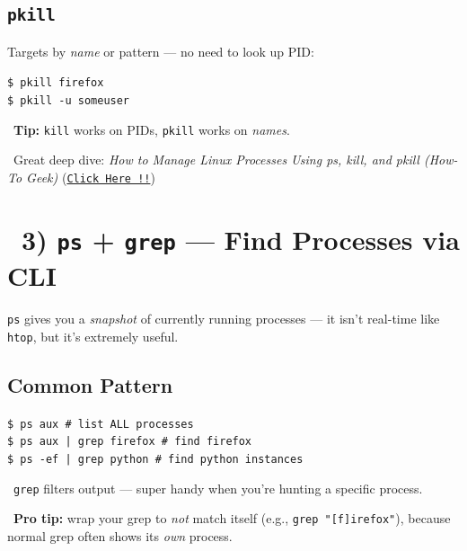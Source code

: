 \documentclass[12pt]{article}
\newcommand{\searchicon}{\faSearch}
\newcommand{\arrowicon}{\faArrowRight}
\begin{document}
\subsection*{\texttt{pkill}}

Targets by \textit{name} or pattern — no need to look up PID:

\begin{highlightbox}
\texttt{\$ pkill firefox}\\
\texttt{\$ pkill -u someuser}
\end{highlightbox}

\begin{infobox}
\faBrain\ \textbf{Tip:} \texttt{kill} works on PIDs, \texttt{pkill} works on \textit{names}.
\end{infobox}

\begin{infobox}
\arrowicon\ Great deep dive: \textit{How to Manage Linux Processes Using ps, kill, and pkill (How-To Geek)} (\href{https://www.howtogeek.com/how-to-manage-linux-processes-using-ps-kill-and-pkill/}{\texttt{Click Here !!}})
\end{infobox}

\section*{\searchicon\ 3) \texttt{ps} + \texttt{grep} — Find Processes via CLI}

\texttt{ps} gives you a \textit{snapshot} of currently running processes — it isn't real-time like \texttt{htop}, but it's extremely useful.

\subsection*{Common Pattern}

\begin{highlightbox}
\texttt{\$ ps aux            \# list ALL processes}\\
\texttt{\$ ps aux | grep firefox   \# find firefox}\\
\texttt{\$ ps -ef | grep python    \# find python instances}
\end{highlightbox}

\begin{infobox}
\faEye\  \texttt{grep} filters output — super handy when you're hunting a specific process. 
\end{infobox}

\begin{infobox}
\faBolt\ \textbf{Pro tip:} wrap your grep to \textit{not} match itself (e.g., \texttt{grep "[f]irefox"}), because normal grep often shows its \textit{own} process.
\end{infobox}
\end{document}
